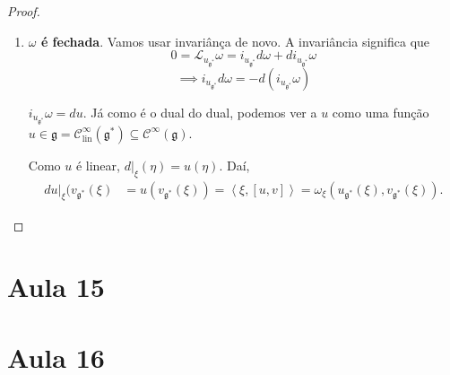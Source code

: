 \begin{proof}
\begin{enumerate}[label=\textbf{Paso \arabic*}]
\item \textbf{$\omega$ é fechada}. Vamos usar invariânça de novo. A invariância significa que
	\[0=\mathcal{L}_{u_{\mathfrak{g}^*}}\omega=i_{u_{\mathfrak{g}^*}}d\omega +di_{u_{\mathfrak{g}^*}}\omega\]
	\[\implies i_{u_{\mathfrak{g}^*}}d\omega =-d(i_{u_{\mathfrak{g}^*}}\omega )\]
	\begin{claim}
		$i_{u_{\mathfrak{g}^*}}\omega =du$. Já como é o dual do dual, podemos ver a $u$ como uma função $u\in\mathfrak{g} =\mathcal{C}^\infty_{\operatorname{lin}}(\mathfrak{g}^*)\subseteq \mathcal{C}^\infty(\mathfrak{g})$.
	\end{claim}
	Como $u$ é linear, $d|_{\xi}(\eta)=u(\eta)$. Daí,
	\begin{align*}
		du|_{\xi}(v_{\mathfrak{g}^*}(\xi )&=u(v_{\mathfrak{g}^*}(\xi ))=\left<\xi,[u,v]\right> =\omega_{\xi}(u_{\mathfrak{g}^*}(\xi ),v_{\mathfrak{g}^*}(\xi )).
	\end{align*}

	\end{enumerate}
\end{proof}
















\section{Aula 15}

\section{Aula 16}



